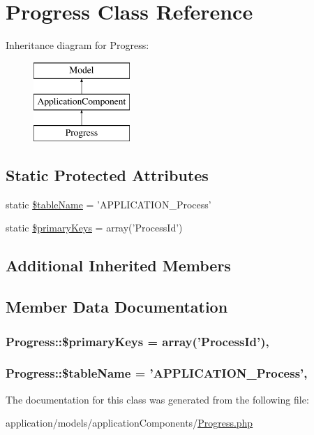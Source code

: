\hypertarget{class_progress}{\section{Progress Class Reference}
\label{class_progress}
}
Inheritance diagram for Progress\-:\begin{figure}[H]
\begin{center}
\leavevmode
\includegraphics[height=3.000000cm]{class_progress}
\end{center}
\end{figure}
\subsection*{Static Protected Attributes}
\begin{DoxyCompactItemize}
\item 
static \hyperlink{class_progress_accf9987c8ebd7a920e74de687468b91e}{\$table\-Name} = 'A\-P\-P\-L\-I\-C\-A\-T\-I\-O\-N\-\_\-\-Process'
\item 
static \hyperlink{class_progress_acd3c7abe1055f68e71e9cce7d03e6f2f}{\$primary\-Keys} = array('Process\-Id')
\end{DoxyCompactItemize}
\subsection*{Additional Inherited Members}


\subsection{Member Data Documentation}
\hypertarget{class_progress_acd3c7abe1055f68e71e9cce7d03e6f2f}{
\subsubsection[{\$primary\-Keys}]{\setlength{\rightskip}{0pt plus 5cm}Progress\-::\$primary\-Keys = array('Process\-Id')\hspace{0.3cm}{\ttfamily [static]}, {\ttfamily [protected]}}}\label{class_progress_acd3c7abe1055f68e71e9cce7d03e6f2f}
\hypertarget{class_progress_accf9987c8ebd7a920e74de687468b91e}{
\subsubsection[{\$table\-Name}]{\setlength{\rightskip}{0pt plus 5cm}Progress\-::\$table\-Name = 'A\-P\-P\-L\-I\-C\-A\-T\-I\-O\-N\-\_\-\-Process'\hspace{0.3cm}{\ttfamily [static]}, {\ttfamily [protected]}}}\label{class_progress_accf9987c8ebd7a920e74de687468b91e}


The documentation for this class was generated from the following file\-:\begin{DoxyCompactItemize}
\item 
application/models/application\-Components/\hyperlink{_progress_8php}{Progress.\-php}\end{DoxyCompactItemize}
